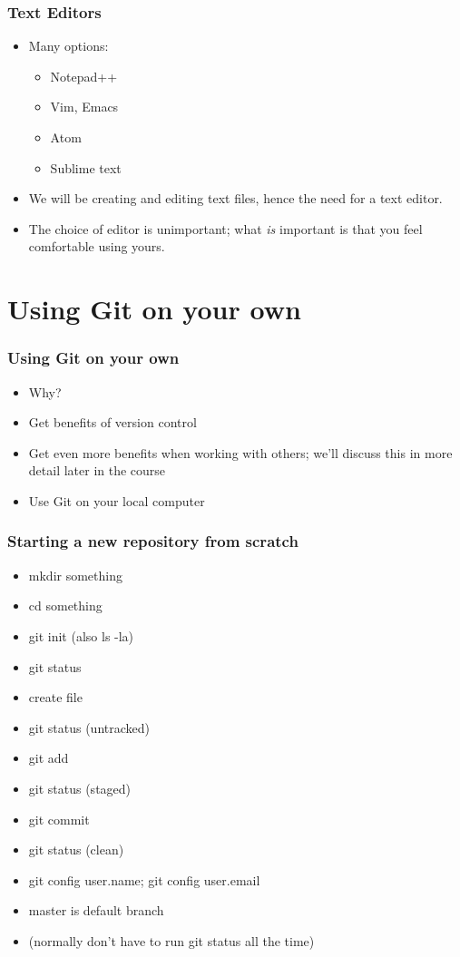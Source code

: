 \documentclass{git_course}
\begin{document}
\begin{frame}
\frametitle{Text Editors}
\begin{itemize}
    \item Many options:
    \begin{itemize}
        \item Notepad++
        \item Vim, Emacs
        \item Atom
        \item Sublime text
    \end{itemize}
    \item We will be creating and editing text files, hence the need for a
        text editor.
    \item The choice of editor is unimportant; what \emph{is} important is
        that you feel comfortable using yours.
\end{itemize}
\end{frame}

\section{Using Git on your own}

\begin{frame}
\frametitle{Using Git on your own}
\begin{itemize}
    \item Why?
    \item Get benefits of version control
    \item Get even more benefits when working with others; we'll discuss
        this in more detail later in the course
    \item Use Git on your local computer
\end{itemize}
\end{frame}

\begin{frame}
\frametitle{Starting a new repository from scratch}
\begin{itemize}
    \item mkdir something
    \item cd something
    \item git init  (also ls -la)
    \item git status
    \item create file
    \item git status (untracked)
    \item git add
    \item git status (staged)
    \item git commit
    \item git status (clean)
    \item git config user.name; git config user.email
    \item master is default branch
    \item (normally don't have to run git status all the time)
\end{itemize}
\end{frame}
\end{document}
